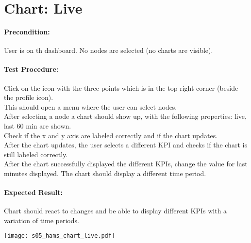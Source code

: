 \documentclass{scrreprt}
\begin{document}
\begin{minipage}[c]{0.4\textwidth}
\section{Chart: Live}

\paragraph{Precondition:}
User is on th dashboard. No nodes are selected (no charts are visible).
\\
\paragraph{Test Procedure:}
Click on the icon with the three points which is in the top right corner
(beside the profile icon).\\
This should open a menu where the user can select nodes.\\
After selecting a node a chart should show up, with the following properties: live, last 60 min are shown.\\
Check if the x and y axis are labeled correctly and if the chart updates.\\
After the chart updates, the user selects a different KPI and checks if
the chart is still labeled correctly.\\
After the chart successfully displayed the different KPIs, change the value for last minutes displayed. The chart should display a different time period.\\

\paragraph{Expected Result:}
Chart should react to changes and be able to display different KPIs with a
variation of time periods.

\end{minipage}
\hfill
\begin{minipage}[c]{0.5\textwidth}
	\texttt{[image: s05\_hams\_chart\_live.pdf]}
\end{minipage}
\end{document}
